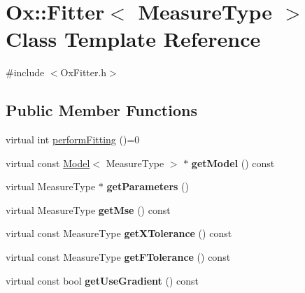 \hypertarget{class_ox_1_1_fitter}{}\section{Ox\+:\+:Fitter$<$ Measure\+Type $>$ Class Template Reference}
\label{class_ox_1_1_fitter}


{\ttfamily \#include $<$Ox\+Fitter.\+h$>$}

\subsection*{Public Member Functions}
\begin{DoxyCompactItemize}
\item 
virtual int \hyperlink{class_ox_1_1_fitter_a8f240f0da86d06b339ab2747e87f21b9}{perform\+Fitting} ()=0
\item 
virtual const \hyperlink{class_ox_1_1_model}{Model}$<$ Measure\+Type $>$ $\ast$ {\bfseries get\+Model} () const \hypertarget{class_ox_1_1_fitter_aab3e83fef361dc2dfa855c4988af2393}{}\label{class_ox_1_1_fitter_aab3e83fef361dc2dfa855c4988af2393}

\item 
virtual Measure\+Type $\ast$ {\bfseries get\+Parameters} ()\hypertarget{class_ox_1_1_fitter_a5e87dd37738745f98d904865f6b89219}{}\label{class_ox_1_1_fitter_a5e87dd37738745f98d904865f6b89219}

\item 
virtual Measure\+Type {\bfseries get\+Mse} () const \hypertarget{class_ox_1_1_fitter_ade772dbac027c450451fc6845ce710f5}{}\label{class_ox_1_1_fitter_ade772dbac027c450451fc6845ce710f5}

\item 
virtual const Measure\+Type {\bfseries get\+X\+Tolerance} () const \hypertarget{class_ox_1_1_fitter_a21f92547f664c9b6f3fa8da4c7d16965}{}\label{class_ox_1_1_fitter_a21f92547f664c9b6f3fa8da4c7d16965}

\item 
virtual const Measure\+Type {\bfseries get\+F\+Tolerance} () const \hypertarget{class_ox_1_1_fitter_ac62bf275718aafc95b5e49d0aa9fc1ef}{}\label{class_ox_1_1_fitter_ac62bf275718aafc95b5e49d0aa9fc1ef}

\item 
virtual const bool {\bfseries get\+Use\+Gradient} () const \hypertarget{class_ox_1_1_fitter_aba3fc8ad5260390faf59e2f904ab6d6d}{}\label{class_ox_1_1_fitter_aba3fc8ad5260390faf59e2f904ab6d6d}


\end{DoxyCompactItemize}
